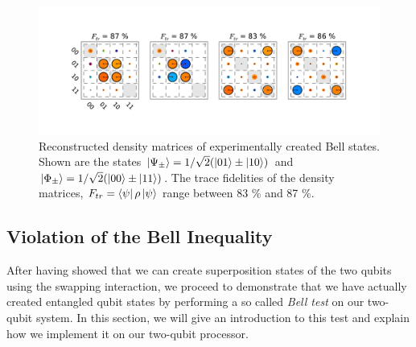 \begin{figure}[ht!]
  \flushright
	\includegraphics[width=1\textwidth]{"./data/ct5/2011_02_09 preparation of bell states/bell matrices"}
	\caption{Reconstructed density matrices of experimentally created Bell states. Shown are the states $\left| \Psi_\pm \right>=1/\sqrt{2}(\left| 01 \right>\pm\left| 10 \right>)$ and $\left| \Phi_\pm \right>=1/\sqrt{2}(\left| 00 \right>\pm\left| 11 \right>)$. The trace fidelities of the density matrices, $F_{tr}=\left< \psi \right|\rho\left| \psi \right>$ range between 83 \% and 87 \%.}
	\label{fig:bell_states}
\end{figure}

\subsection{Violation of the Bell Inequality}

After having showed that we can create superposition states of the two qubits using the swapping interaction, we proceed to demonstrate that we have actually created entangled qubit states by performing a so called {\it Bell test} on our two-qubit system. In this section, we will give an introduction to this test and explain how we implement it on our two-qubit processor.

\smallskip

